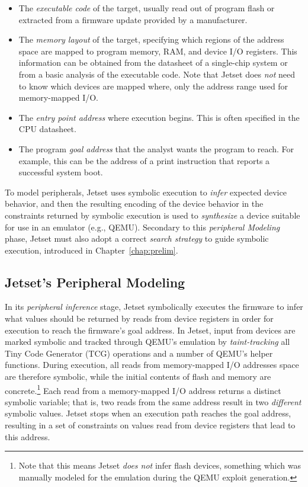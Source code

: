 \begin{itemize}[noitemsep, leftmargin=12pt]
\item The \emph{executable code} of the target, usually read out of program flash or extracted from a firmware update provided by a manufacturer.
\item The \emph{memory layout} of the target, specifying which regions of the address space are mapped to program memory, RAM, and device I/O registers.
This information can be obtained from the datasheet of a single-chip system or from a basic analysis of the executable code. Note that Jetset does \emph{not} need to know which devices are mapped where, only the address range used for memory-mapped I/O.
\item The \emph{entry point address} where execution begins.
This is often specified in the CPU datasheet.
\item The program \emph{goal address} that the analyst wants the program to reach.
For example, this can be the address of a print instruction that reports a successful system boot.
\end{itemize}

To model peripherals, Jetset uses symbolic execution to \emph{infer} expected device behavior, and then the resulting encoding of the device behavior in the constraints returned by symbolic execution is used to \emph{synthesize} a device suitable for use in an emulator (e.g., QEMU).
Secondary to this \emph{peripheral Modeling} phase, Jetset must also adopt a correct \emph{search strategy} to guide symbolic execution, introduced in Chapter~\ref{chap:prelim}.

\subsection{Jetset's Peripheral Modeling}
In its \emph{peripheral inference} stage, Jetset symbolically executes the firmware to infer what values should be returned by reads from device registers in order for execution to reach the firmware's goal address.
In Jetset, input from devices are marked symbolic and tracked through QEMU's emulation by \emph{taint-tracking} all Tiny Code Generator (TCG) operations and a number of QEMU's helper functions.
During execution, all reads from memory-mapped I/O addresses space are therefore symbolic, while the initial contents of flash and memory are concrete.\footnote{Note that this means Jetset \emph{does not} infer flash devices, something which was manually modeled for the emulation during the QEMU exploit generation.}
Each read from a memory-mapped I/O address returns a distinct symbolic variable; that is, two reads from the same address result in two \emph{different} symbolic values.
Jetset stops when an execution path reaches the goal address, resulting in a set of constraints on values read from device registers that lead to this address.

